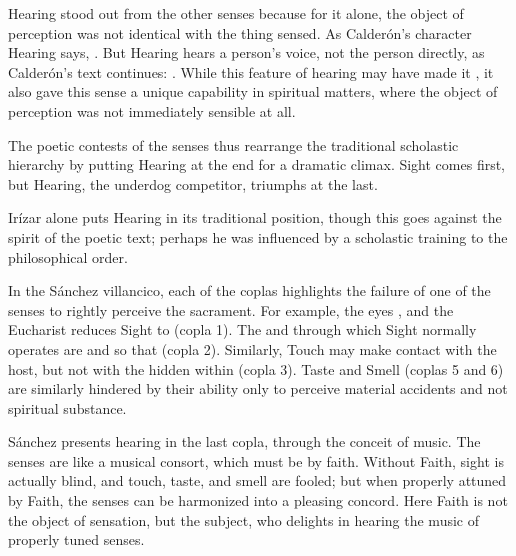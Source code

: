 Hearing stood out from the other senses because for it alone, the object of 
perception was not identical with the thing sensed.
As Calderón's character Hearing says, .%
\Autocite[]{Calderon:Retiro}
But Hearing hears a person's voice, not the person directly, as Calderón's text 
continues: .%
\Autocite[]{Calderon:Retiro}
While this feature of hearing may have made it , it 
also gave this sense a unique capability in spiritual matters, where the object 
of perception was not immediately sensible at all.

The poetic contests of the senses thus rearrange the traditional scholastic 
hierarchy by putting Hearing at the end for a dramatic climax.
Sight comes first, but Hearing, the underdog competitor, triumphs at the last.%
    \begin{Footnote}
        Irízar alone puts Hearing in its traditional position, though this goes
        against the spirit of the poetic text; perhaps he was influenced by a
        scholastic training to  the philosophical order.
    \end{Footnote}
In the Sánchez villancico, each of the coplas highlights the failure of one of 
the senses to rightly perceive the sacrament.
For example, the eyes , and the Eucharist 
reduces Sight to  (copla 1).
The  and  through which Sight normally 
operates are   and 
 so that  (copla 2).
Similarly, Touch may make contact with the host, but not with the 
 hidden within (copla 3).
Taste and Smell (coplas 5 and 6) are similarly hindered by their ability only 
to perceive material accidents and not spiritual substance.

Sánchez presents hearing in the last copla, through the conceit of music.
The senses are  like a musical consort, which must be 
 by faith.
Without Faith, sight is actually blind, and touch, taste, and smell are fooled; 
but when properly attuned by Faith, the senses can be harmonized into a 
pleasing concord.
Here Faith is not the object of sensation, but the subject, who delights in 
hearing the music of properly tuned senses.

